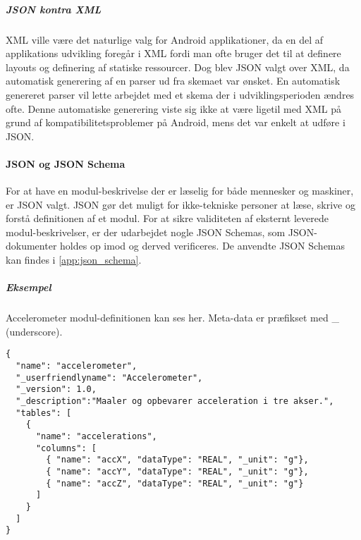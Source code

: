 \subparagraph{JSON kontra XML}
XML ville være det naturlige valg for Android applikationer, da en del af applikations udvikling foregår i XML fordi man ofte bruger det til at definere layouts og definering af statiske ressourcer. 
Dog blev JSON valgt over XML, da automatisk generering af en parser ud fra skemaet var ønsket.
En automatisk genereret parser vil lette arbejdet med et skema der i udviklingsperioden ændres ofte.
Denne automatiske generering viste sig ikke at være ligetil med XML på grund af kompatibilitetsproblemer på Android, mens det var enkelt at udføre i JSON.

\paragraph{JSON og JSON Schema}
For at have en modul-beskrivelse der er læselig for både mennesker og maskiner, er JSON valgt.
JSON gør det muligt for ikke-tekniske personer at læse, skrive og forstå definitionen af et modul.
For at sikre validiteten af eksternt leverede modul-beskrivelser, er der udarbejdet nogle JSON Schemas, som JSON-dokumenter holdes op imod og derved verificeres.
De anvendte JSON Schemas kan findes i \cref{app:json_schema}.

\subparagraph{Eksempel} Accelerometer modul-definitionen kan ses her.
Meta-data er præfikset med \_ (underscore).
\begin{lstlisting}
{
  "name": "accelerometer",
  "_userfriendlyname": "Accelerometer",
  "_version": 1.0,
  "_description":"Maaler og opbevarer acceleration i tre akser.",
  "tables": [
    {
      "name": "accelerations",
      "columns": [
        { "name": "accX", "dataType": "REAL", "_unit": "g"},
        { "name": "accY", "dataType": "REAL", "_unit": "g"},
        { "name": "accZ", "dataType": "REAL", "_unit": "g"}
      ]
    }
  ]
}
\end{lstlisting}